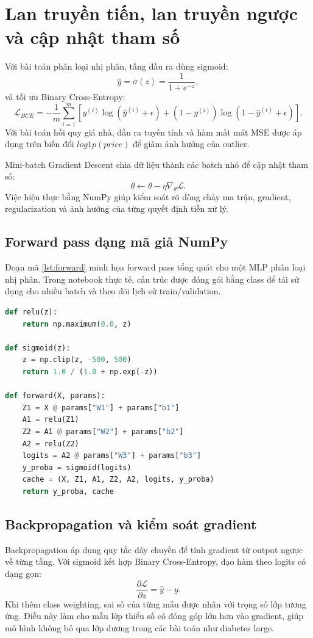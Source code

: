 \documentclass[12pt,a4paper]{report}
\begin{document}
\section{Lan truyền tiến, lan truyền ngược và cập nhật tham số}
Với bài toán phân loại nhị phân, tầng đầu ra dùng sigmoid:
\begin{equation}
    \hat{y} = \sigma(z) = \frac{1}{1 + e^{-z}},
\end{equation}
và tối ưu Binary Cross-Entropy:
\begin{equation}
    \mathcal{L}_{BCE} =
    -\frac{1}{m}\sum_{i=1}^{m}
    \left[y^{(i)}\log(\hat{y}^{(i)}+\epsilon)
    +(1-y^{(i)})\log(1-\hat{y}^{(i)}+\epsilon)\right].
\end{equation}
Với bài toán hồi quy giá nhà, đầu ra tuyến tính và hàm mất mát MSE được áp dụng trên biến đổi $log1p(price)$ để giảm ảnh hưởng của outlier.

Mini-batch Gradient Descent chia dữ liệu thành các batch nhỏ để cập nhật tham số:
\begin{equation}
    \theta \leftarrow \theta - \eta \nabla_{\theta}\mathcal{L}.
\end{equation}
Việc hiện thực bằng NumPy giúp kiểm soát rõ dòng chảy ma trận, gradient, regularization và ảnh hưởng của từng quyết định tiền xử lý.

\subsection{Forward pass dạng mã giả NumPy}
Đoạn mã \ref{lst:forward} minh họa forward pass tổng quát cho một MLP phân loại nhị phân.
Trong notebook thực tế, cấu trúc được đóng gói bằng class để tái sử dụng cho nhiều batch và theo dõi lịch sử train/validation.

\begin{lstlisting}[language=Python, caption={Forward pass MLP phân loại nhị phân bằng NumPy}, label={lst:forward}]
def relu(z):
    return np.maximum(0.0, z)

def sigmoid(z):
    z = np.clip(z, -500, 500)
    return 1.0 / (1.0 + np.exp(-z))

def forward(X, params):
    Z1 = X @ params["W1"] + params["b1"]
    A1 = relu(Z1)
    Z2 = A1 @ params["W2"] + params["b2"]
    A2 = relu(Z2)
    logits = A2 @ params["W3"] + params["b3"]
    y_proba = sigmoid(logits)
    cache = (X, Z1, A1, Z2, A2, logits, y_proba)
    return y_proba, cache
\end{lstlisting}

\subsection{Backpropagation và kiểm soát gradient}
Backpropagation áp dụng quy tắc dây chuyền để tính gradient từ output ngược về từng tầng.
Với sigmoid kết hợp Binary Cross-Entropy, đạo hàm theo logits có dạng gọn:
\begin{equation}
    \frac{\partial \mathcal{L}}{\partial z} = \hat{y} - y.
\end{equation}
Khi thêm class weighting, sai số của từng mẫu được nhân với trọng số lớp tương ứng.
Điều này làm cho mẫu lớp thiểu số có đóng góp lớn hơn vào gradient, giúp mô hình không bỏ qua lớp dương trong các bài toán như diabetes large.
\end{document}
